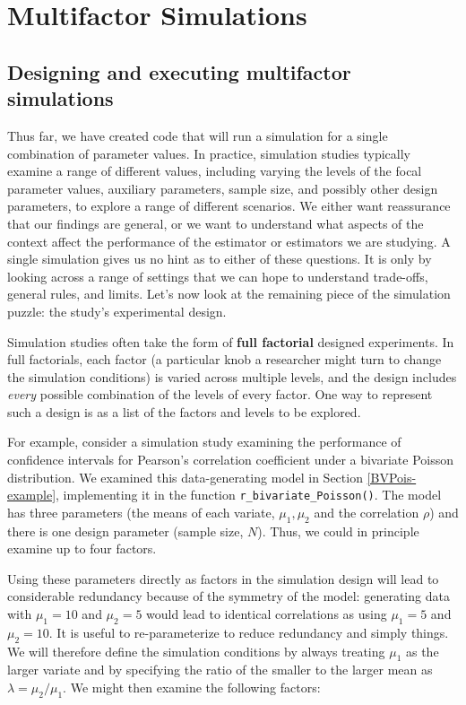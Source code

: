 \documentclass[
]{book}
\begin{document}
\part{Multifactor Simulations}\label{part-multifactor-simulations}

\chapter{Designing and executing multifactor simulations}\label{exp-design}

Thus far, we have created code that will run a simulation for a single combination of parameter values.
In practice, simulation studies typically examine a range of different values, including varying the levels of the focal parameter values, auxiliary parameters, sample size, and possibly other design parameters, to explore a range of different scenarios.
We either want reassurance that our findings are general, or we want to understand what aspects of the context affect the performance of the estimator or estimators we are studying.
A single simulation gives us no hint as to either of these questions.
It is only by looking across a range of settings that we can hope to understand trade-offs, general rules, and limits.
Let's now look at the remaining piece of the simulation puzzle: the study's experimental design.

Simulation studies often take the form of \textbf{full factorial} designed experiments.
In full factorials, each factor (a particular knob a researcher might turn to change the simulation conditions) is varied across multiple levels, and the design includes \emph{every} possible combination of the levels of every factor. One way to represent such a design is as a list of the factors and levels to be explored.

For example, consider a simulation study examining the performance of confidence intervals for Pearson's correlation coefficient under a bivariate Poisson distribution.
We examined this data-generating model in Section \ref{BVPois-example}, implementing it in the function \texttt{r\_bivariate\_Poisson()}. The model has three parameters (the means of each variate, \(\mu_1, \mu_2\) and the correlation \(\rho\)) and there is one design parameter (sample size, \(N\)).
Thus, we could in principle examine up to four factors.

Using these parameters directly as factors in the simulation design will lead to considerable redundancy because of the symmetry of the model: generating data with \(\mu_1 = 10\) and \(\mu_2 = 5\) would lead to identical correlations as using \(\mu_1 = 5\) and \(\mu_2 = 10\).
It is useful to re-parameterize to reduce redundancy and simply things.
We will therefore define the simulation conditions by always treating \(\mu_1\) as the larger variate and by specifying the ratio of the smaller to the larger mean as \(\lambda = \mu_2 / \mu_1\).
We might then examine the following factors:
\end{document}

